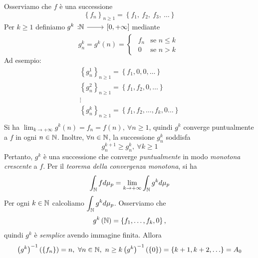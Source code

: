 \begin{demonstration}
	Osserviamo che $f$ è una successione
	\begin{equation*}
		\left\{f_n\right\}_{n\geq 1}=\left\{f_1,\ f_2,\ f_3,\ \ldots\right\}
	\end{equation*}
Per $k\geq 1$ definiamo $\funz{g^k}{\naturalset}{\left[0,+\infty\right]}$ mediante
\begin{equation*}
	g^k_n=g^k\left(n\right)=\begin{cases}
		\begin{array}{ll}
			f_n &\text{se }n\leq k\\
			0 &\text{se }n>k
		\end{array}
	\end{cases}
\end{equation*}
Ad esempio:
\begin{gather*}
	\left\{g^1_n\right\}_{n\geq 1}=\left\{f_1,0,0,\ldots\right\}\\
	\left\{g^2_n\right\}_{n\geq 1}=\left\{f_1,f_2,0,\ldots\right\}\\
	\vdots\\
	\left\{g^k_n\right\}_{n\geq 1}=\left\{f_1,f_2,\ldots,f_k,0\ldots\right\}\\
\end{gather*}
Si ha $\displaystyle\lim_{k\to+\infty}g^k\left(n\right)=f_n=f\left(n\right),\ \forall n\geq 1$, quindi $g^k$ converge puntualmente a $f$ in ogni $n\in\mathbb{N}$. Inoltre, $\forall n\in\mathbb{N}$, la successione $g^k_n$ soddisfa
\begin{equation*}
	g^{k+1}_n\geq g^k_n,\ \forall k\geq 1
\end{equation*}
Pertanto, $g^k$ è una successione che converge \textit{puntualmente} in modo \textit{monotona crescente} a $f$. Per il \textit{teorema della convergenza monotona}, si ha
\begin{equation*}
	\int_{\mathbb{N}}fd\mu_p=\lim_{k\to+\infty}\int_{\mathbb{N}}g^kd\mu_p
\end{equation*}
Per ogni $k\in\mathbb{N}$ calcoliamo $\displaystyle\int_{\mathbb{N}}g^kd\mu_p$. Osserviamo che
\begin{equation*}
	g^k\left(\mathbb{N}\right)=\left\{f_1,\ldots,f_k,0\right\},
\end{equation*}
quindi $g^k$ è \textit{semplice} avendo immagine finita. Allora
\begin{equation*}
	\left(g^k\right)^{-1}\left(\left\{f_n\right\}\right)=n,\ \forall n\in\naturalset,\ n\geq k\\
	\left(g^k\right)^{-1}\left(\left\{0\right\}\right)=\left\{k+1,k+2,\ldots\right\}=A_0

\end{equation*}
\end{demonstration}
